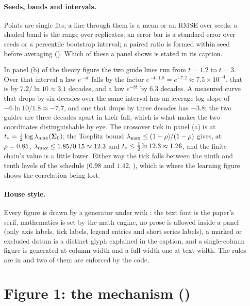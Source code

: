 \paragraph{Seeds, bands and intervals.} Points are single fits; a line through them is
a mean or an RMSE over seeds; a shaded band is the range over replicates; an error bar
is a standard error over seeds or a percentile bootstrap interval; a paired ratio is
formed within seed before averaging (). Which of these
a panel shows is stated in its caption.

\begin{example}
\label{ex:reading-slopes}
In panel (b) of the theory figure the two guide lines run from $t=1.2$ to $t=3$. Over
that interval a law $e^{-4t}$ falls by the factor $e^{-4\cdot1.8}=e^{-7.2}\approx7.5\times10^{-4}$,
that is by $7.2/\ln10\approx3.1$ decades, and a law $e^{-8t}$ by $6.3$ decades. A measured
curve that drops by six decades over the same interval has an average log-slope of
$-6\ln10/1.8\approx-7.7$, and one that drops by three decades has $-3.8$: the two guides
are three decades apart in their fall, which is what makes the two coordinates
distinguishable by eye. The crossover tick in panel (a) is at
$t_{*}=\tfrac12\log\lambda_{\max}(\mathbf{\Sigma}_0)$; the Toeplitz bound $\lambda_{\max}\le(1+\rho)/(1-\rho)$ gives,
at $\rho=0.85$, $\lambda_{\max}\le1.85/0.15\approx12.3$ and $t_{*}\le\tfrac12\ln12.3\approx1.26$,
and the finite chain's value is a little lower. Either way the tick falls between the
ninth and tenth levels of the schedule ($0.98$ and $1.42$, ), which is
where the learning figure shows the correlation being lost.
\end{example}

\paragraph{House style.} Every figure is drawn by a generator under  with
: the text font is the paper's serif, mathematics is set by the
math engine, no prose is allowed inside a panel (only axis labels, tick labels, legend
entries and short series labels), a marked or excluded datum is a distinct glyph
explained in the caption, and a single-column figure is generated at column width and a
full-width one at text width. The rules are in 
and two of them are enforced by the code.

\section{Figure 1: the mechanism ()}
\label{sec:fig-mechanism}

